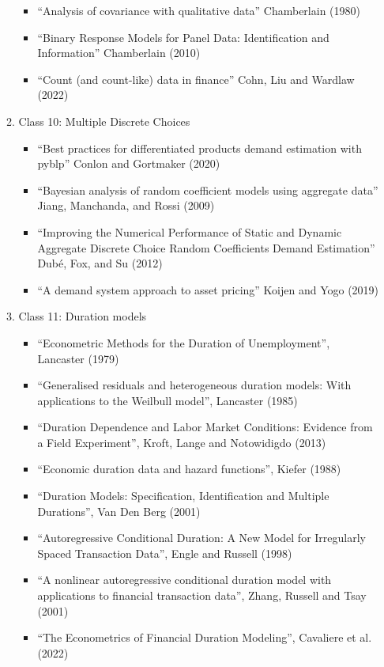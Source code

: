 \documentclass[11pt, a4paper]{article}
\begin{document}
\begin{enumerate}
\begin{enumerate}
\begin{itemize}
    \item ``Analysis of covariance with qualitative data'' Chamberlain (1980)
    \item ``Binary Response Models for Panel Data: Identification and Information'' Chamberlain (2010)
    \item ``Count (and count-like) data in finance'' Cohn, Liu and Wardlaw (2022)
    \end{itemize}
  \item Class 10: Multiple Discrete Choices
    \begin{itemize}
    \item ``Best practices for differentiated products demand estimation with pyblp'' Conlon and Gortmaker (2020)
    \item ``Bayesian analysis of random coefficient models using aggregate data'' Jiang, Manchanda, and Rossi (2009)
    \item ``Improving the Numerical Performance of Static and Dynamic Aggregate Discrete Choice Random Coefficients Demand Estimation'' Dub\'e, Fox, and Su (2012)
    \item ``A demand system approach to asset pricing'' Koijen and Yogo (2019)      
    \end{itemize}
  \item Class 11: Duration models
    \begin{itemize}
    \item ``Econometric Methods for the Duration of Unemployment'', Lancaster (1979)
    \item ``Generalised residuals and heterogeneous duration models: With applications to the Weilbull model'', Lancaster (1985)
    \item ``Duration Dependence and Labor Market Conditions: Evidence from a Field Experiment'', Kroft, Lange and Notowidigdo (2013)
    \item ``Economic duration data and hazard functions'', Kiefer (1988)
    \item ``Duration Models: Specification, Identification and Multiple Durations'', Van Den Berg (2001)
    \item ``Autoregressive Conditional Duration: A New Model for Irregularly Spaced Transaction Data'', Engle and Russell (1998)
    \item ``A nonlinear autoregressive conditional duration model with applications to financial transaction data'', Zhang, Russell and Tsay (2001)
    \item ``The Econometrics of Financial Duration Modeling'', Cavaliere et al. (2022)

\end{itemize}
\end{enumerate}
\end{enumerate}
\end{document}

